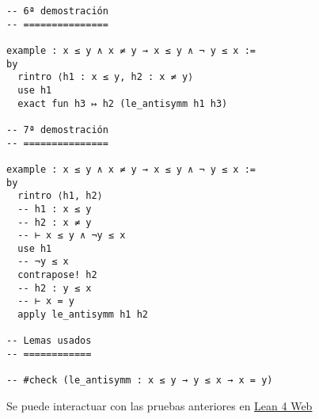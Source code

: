 \begin{verbatim}
-- 6ª demostración
-- ===============

example : x ≤ y ∧ x ≠ y → x ≤ y ∧ ¬ y ≤ x :=
by
  rintro ⟨h1 : x ≤ y, h2 : x ≠ y⟩
  use h1
  exact fun h3 ↦ h2 (le_antisymm h1 h3)

-- 7ª demostración
-- ===============

example : x ≤ y ∧ x ≠ y → x ≤ y ∧ ¬ y ≤ x :=
by
  rintro ⟨h1, h2⟩
  -- h1 : x ≤ y
  -- h2 : x ≠ y
  -- ⊢ x ≤ y ∧ ¬y ≤ x
  use h1
  -- ¬y ≤ x
  contrapose! h2
  -- h2 : y ≤ x
  -- ⊢ x = y
  apply le_antisymm h1 h2

-- Lemas usados
-- ============

-- #check (le_antisymm : x ≤ y → y ≤ x → x = y)
\end{verbatim}
Se puede interactuar con las pruebas anteriores en \href{https://lean.math.hhu.de/\#url=https://raw.githubusercontent.com/jaalonso/Calculemus2/main/src/Entre\_desigualdades.lean}{Lean 4 Web}


